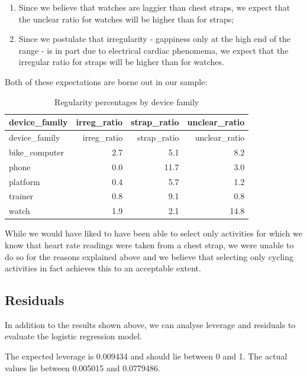 \documentclass[
  letterpaper,
  DIV=11,
  numbers=noendperiod]{scrartcl}
\providecommand{\tightlist}{%
  \setlength{\itemsep}{0pt}\setlength{\parskip}{0pt}}\usepackage{longtable,booktabs,array}
\begin{document}
\begin{enumerate}
\def\labelenumi{\arabic{enumi}.}
\tightlist
\item
  Since we believe that watches are laggier than chest straps, we expect
  that the unclear ratio for watches will be higher than for straps;\\
\item
  Since we postulate that irregularity - gappiness only at the high end
  of the range - is in part due to electrical cardiac phenomema, we
  expect that the irregular ratio for straps will be higher than for
  watches.
\end{enumerate}

Both of these expectations are borne out in our sample:

\begin{longtable}[]{@{}lrrr@{}}
\caption{Regularity percentages by device family}\tabularnewline
\toprule\noalign{}
device\_family & irreg\_ratio & strap\_ratio & unclear\_ratio \\
\midrule\noalign{}
\endfirsthead
\toprule\noalign{}
device\_family & irreg\_ratio & strap\_ratio & unclear\_ratio \\
\midrule\noalign{}
\endhead
\bottomrule\noalign{}
\endlastfoot
bike\_computer & 2.7 & 5.1 & 8.2 \\
phone & 0.0 & 11.7 & 3.0 \\
platform & 0.4 & 5.7 & 1.2 \\
trainer & 0.8 & 9.1 & 0.8 \\
watch & 1.9 & 2.1 & 14.8 \\
\end{longtable}

While we would have liked to have been able to select only activities
for which we know that heart rate readings were taken from a chest
strap, we were unable to do so for the reasons explained above and we
believe that selecting only cycling activities in fact achieves this to
an acceptable extent.

\subsection{Residuals}\label{residuals}

In addition to the results shown above, we can analyse leverage and
residuals to evaluate the logistic regression model.

The expected leverage is 0.009434 and should lie between 0 and 1. The
actual values lie between 0.005015 and 0.0779486.
\end{document}

